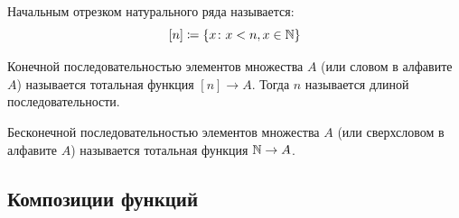 \documentclass[12pt]{article}
\begin{document}
\begin{definition}
	Начальным отрезком натурального ряда называется:
	\[[n]\coloneqq \{x\colon x<n, x\in \mathbb{N}\}\]
\end{definition}
\begin{definition}
	Конечной последовательностью элементов множества $A$ (или словом в
	алфавите $A$) называется тотальная функция $[n]\to A$. Тогда $n$
	называется длиной последовательности.
\end{definition}
\begin{definition}
	Бесконечной последовательностью элементов множества $A$ (или
	сверхсловом в алфавите $A$) называется тотальная функция $\mathbb{N}\to A$.
\end{definition}

\subsection{Композиции функций}
\end{document}
